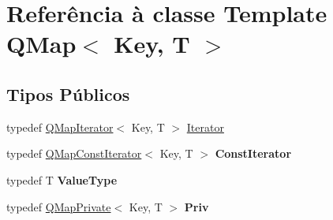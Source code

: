\hypertarget{class_q_map}{\section{Referência à classe Template Q\-Map$<$ Key, T $>$}
\label{class_q_map}
}
\subsection*{Tipos Públicos}
\begin{DoxyCompactItemize}
\item 
typedef \hyperlink{class_q_map_iterator}{Q\-Map\-Iterator}$<$ Key, T $>$ \hyperlink{class_q_map_a8037b7e85b3b6dc9ae44eccdf67eccb6}{Iterator}
\item 
\hypertarget{class_q_map_ab549c7b3fba54c1d480524f4dba47517}{typedef \hyperlink{class_q_map_const_iterator}{Q\-Map\-Const\-Iterator}$<$ Key, T $>$ {\bfseries Const\-Iterator}}\label{class_q_map_ab549c7b3fba54c1d480524f4dba47517}

\item 
\hypertarget{class_q_map_a215e2850ed819f54851fa725fdc8842c}{typedef T {\bfseries Value\-Type}}\label{class_q_map_a215e2850ed819f54851fa725fdc8842c}

\item 
\hypertarget{class_q_map_a4fa0acd9a3a73b132639a6730a3b9815}{typedef \hyperlink{class_q_map_private}{Q\-Map\-Private}$<$ Key, T $>$ {\bfseries Priv}}\label{class_q_map_a4fa0acd9a3a73b132639a6730a3b9815}

\end{DoxyCompactItemize}
